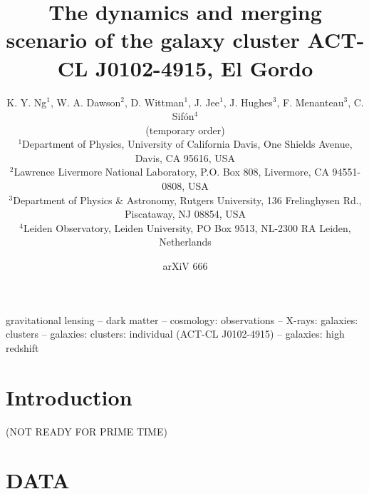 


\title[The dynamics and merging scenario of ACT-CL
J0102-4915, El Gordo]{The dynamics and merging scenario of the galaxy cluster 
ACT-CL J0102-4915, 
El Gordo}
\author[K. Y. Ng et al.]{K. Y. Ng$^{1}$, W. A. Dawson$^{2}$, D. Wittman$^{1}$, J.
Jee$^{1}$, J. Hughes$^{3}$, F. Menanteau$^{3}$, C. Sif\'{o}n$^{4}$\\
(temporary order)\\
$^{1}$Department of Physics, University of California Davis, One Shields
Avenue, Davis, CA 95616, USA\\ 
$^{2}$Lawrence Livermore National Laboratory, P.O. Box 808, Livermore, CA
94551-0808, USA \\
$^3$Department of Physics \& Astronomy,
Rutgers University, 136 Frelinghysen Rd., Piscataway, NJ 08854, USA\\
$^{4}$Leiden Observatory, Leiden University, PO Box 9513, NL-2300 RA
Leiden, Netherlands\\}


\date{arXiV 666} \pagerange{\pageref{firstpage}--\pageref{lastpage}}
 \maketitle \label{firstpage}
\begin{abstract} 
    
\end{abstract}
\begin{keywords}
gravitational lensing -- dark matter -- cosmology: observations -- X-rays:
galaxies: clusters -- galaxies: clusters: individual (ACT-CL J0102-4915) --
galaxies: high redshift 
\end{keywords}

\section{Introduction} 
(NOT READY FOR PRIME TIME)

\section{DATA}

